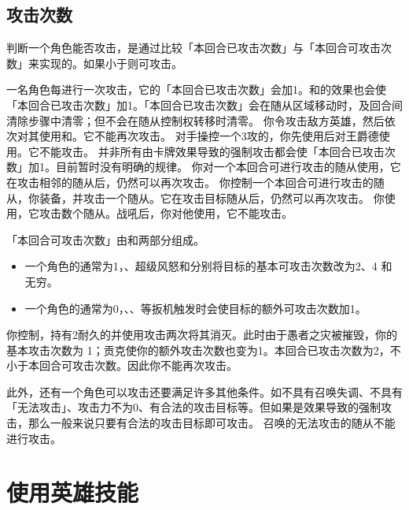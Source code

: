 \subsection{攻击次数}

判断一个角色能否攻击，是通过比较「本回合已攻击次数」与「本回合可攻击次数」来实现的。如果小于则可攻击。

一名角色每进行一次攻击，它的「本回合已攻击次数」会加1。和的效果也会使「本回合已攻击次数」加1。「本回合已攻击次数」会在随从区域移动时，及回合间清除步骤中清零；但不会在随从控制权转移时清零。
\example 你令攻击敌方英雄，然后依次对其使用和。它不能再次攻击。
\example 对手操控一个3攻的，你先使用后对王爵德使用。它不能攻击。
\notice 并非所有由卡牌效果导致的强制攻击都会使「本回合已攻击次数」加1。目前暂时没有明确的规律。
\example 你对一个本回合可进行攻击的随从使用，它在攻击相邻的随从后，仍然可以再次攻击。
\example 你控制一个本回合可进行攻击的随从，你装备，并攻击一个随从。它在攻击目标随从后，仍然可以再次攻击。
\example 你使用，它攻击数个随从。战吼后，你对他使用，它不能攻击。

「本回合可攻击次数」由和两部分组成。
\begin{itemize}
    \item 一个角色的通常为1，、超级风怒和分别将目标的基本可攻击次数改为2、4 和无穷。
    \item 一个角色的通常为0，、、等扳机触发时会使目标的额外可攻击次数加1。
\end{itemize}
\example 你控制，持有2耐久的并使用攻击两次将其消灭。此时由于愚者之灾被摧毁，你的基本攻击次数为 1；贡克使你的额外攻击次数也变为1。本回合已攻击次数为2，不小于本回合可攻击次数。因此你不能再次攻击。

此外，还有一个角色可以攻击还要满足许多其他条件。如不具有召唤失调、不具有「无法攻击」、攻击力不为0、有合法的攻击目标等。但如果是效果导致的强制攻击，那么一般来说只要有合法的攻击目标即可攻击。
\exception {}召唤的无法攻击的随从不能进行攻击。

\section{使用英雄技能}

